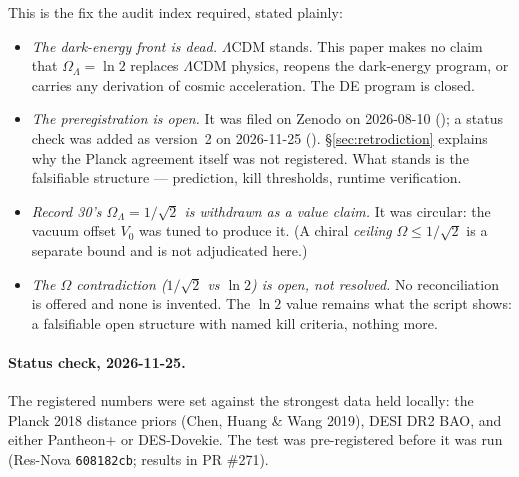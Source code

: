 \documentclass{alienfolio}
\begin{document}
This is the fix the audit index required, stated plainly:

\begin{itemize}
\item \emph{The dark-energy front is dead.} $\Lambda$CDM stands.
This paper makes no claim that $\Omega_{\Lambda} = \ln 2$ replaces
$\Lambda$CDM physics, reopens the dark-energy program, or carries
any derivation of cosmic acceleration. The DE program is closed.
\item \emph{The preregistration is open.} It was filed on Zenodo on
2026-08-10 (); a status check was added
as version~2 on 2026-11-25 ().
\S\ref{sec:retrodiction} explains why the Planck agreement itself was
not registered. What stands is the falsifiable structure ---
prediction, kill thresholds, runtime verification.
\item \emph{Record 30's $\Omega_{\Lambda} = 1/\sqrt{2}$ is
withdrawn as a value claim.} It was circular: the vacuum offset
$V_{0}$ was tuned to produce it. (A chiral \emph{ceiling}
$\Omega \le 1/\sqrt{2}$ is a separate bound and is not adjudicated
here.)
\item \emph{The $\Omega$ contradiction ($1/\sqrt{2}$ vs $\ln 2$) is
open, not resolved.} No reconciliation is offered and none is
invented. The $\ln 2$ value remains what the script shows: a
falsifiable open structure with named kill criteria, nothing more.
\end{itemize}

\paragraph{Status check, 2026-11-25.} The registered numbers were set
against the strongest data held locally: the Planck 2018 distance
priors (Chen, Huang \& Wang 2019), DESI DR2 BAO, and either Pantheon+
or DES-Dovekie. The test was pre-registered before it was run
(Res-Nova \texttt{608182cb}; results in PR \#271).
\end{document}
